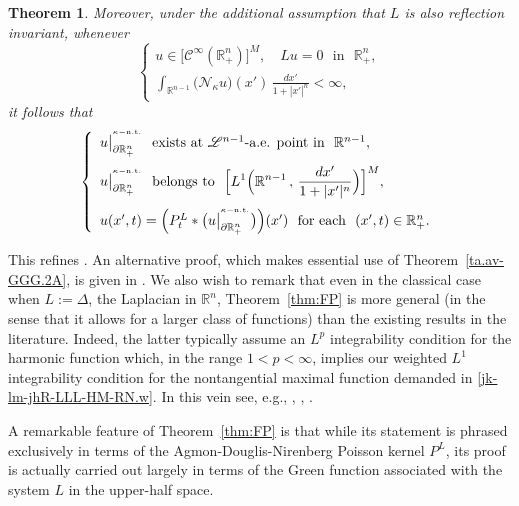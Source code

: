 \documentclass[11pt,reqno]{amsart}
\numberwithin{equation}{section}
\newtheorem{theorem}{Theorem}[section]
\theoremstyle{remark}
\begin{document}
\begin{theorem}
Moreover, under the additional assumption that $L$ is also reflection invariant, whenever  
%
\begin{equation}\label{jk-lm-jhR-LLL-HM-RN.w.BIS}
\left\{
\begin{array}{l}
u\in\big[{\mathscr{C}}^{\infty}({\mathbb{R}}^n_{+})\big]^M,\quad Lu=0\,\,\text{ in }\,\,{\mathbb{R}}^n_{+},
\\[8pt]
\displaystyle
\int_{\mathbb{R}^{n-1}}\big({\mathcal{N}}_{\kappa}u\big)(x')\,\frac{dx'}{1+|x'|^{n}}<\infty,
\end{array}
\right.
\end{equation}
%
it follows that 
%
\begin{eqnarray}\label{Tafva.2222.BIS}
\left\{
\begin{array}{l}
u\big|^{{}^{\kappa-{\rm n.t.}}}_{\partial{\mathbb{R}}^n_{+}}
\,\,\text{ exists at ${\mathscr{L}}^{n-1}$-a.e. point in }\,\,{\mathbb{R}}^{n-1},
\\[10pt]
\displaystyle
u\big|^{{}^{\kappa-{\rm n.t.}}}_{\partial{\mathbb{R}}^n_{+}}\,\,\text{ belongs to }\,\,
\Big[L^1\Big({\mathbb{R}}^{n-1}\,,\,\frac{dx'}{1+|x'|^{n}}\Big)\Big]^M,
\\[12pt]
u(x',t)=\Big(P^L_t\ast\big(u\big|^{{}^{\kappa-{\rm n.t.}}}_{\partial{\mathbb{R}}^n_{+}}\big)\Big)(x')
\,\,\text{ for each }\,\,(x',t)\in{\mathbb{R}}^n_{+}.
\end{array}
\right.
\end{eqnarray}
\end{theorem}

This refines \cite[Theorem~6.1, p.\,956]{MMMM16}. An alternative proof, which makes essential use of 
Theorem~\ref{ta.av-GGG.2A}, is given in \cite{MMMMM-Fatou}. We also wish to remark that even in the classical 
case when $L:=\Delta$, the Laplacian in ${\mathbb{R}}^n$, Theorem~\ref{thm:FP} is more general 
(in the sense that it allows for a larger class of functions) than the existing results in the literature. 
Indeed, the latter typically assume an $L^p$ integrability condition for the harmonic function which, in the 
range $1<p<\infty$, implies our weighted $L^1$ integrability condition for the nontangential 
maximal function demanded in \eqref{jk-lm-jhR-LLL-HM-RN.w}. In this vein see, e.g.,  
\cite[Theorems~4.8-4.9, pp.\,174-175]{GCRF85}, \cite[Corollary, p.\,200]{St70},
\cite[Proposition~1, p.\,119]{Stein93}. 

A remarkable feature of Theorem~\ref{thm:FP} is that while its statement is phrased exclusively 
in terms of the Agmon-Douglis-Nirenberg Poisson kernel $P^L$, its proof is actually carried out 
largely in terms of the Green function associated with the system $L$ in the upper-half space. 
\end{document}
